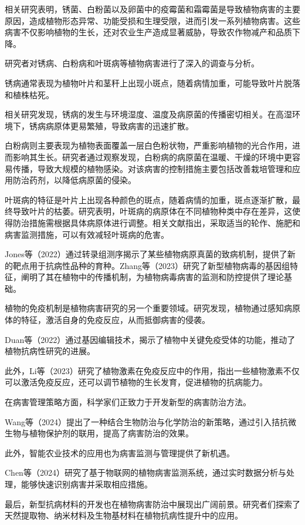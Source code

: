 \documentclass[AutoFakeBold]{LZUThesis-PgD&PhD}
\begin{document}
相关研究表明，锈菌、白粉菌以及卵菌中的疫霉菌和霜霉菌是导致植物病害的主要原因，造成植物形态异常、功能受损和生理受限，进而引发一系列植物病害。这些病害不仅影响植物的生长，还对农业生产造成显著威胁，导致农作物减产和品质下降。

研究者对锈病、白粉病和叶斑病等植物病害进行了深入的调查与分析。

锈病通常表现为植物叶片和茎秆上出现小斑点，随着病情加重，可能导致叶片脱落和植株枯死。

相关研究发现，锈病的发生与环境湿度、温度及病原菌的传播密切相关。在高湿环境下，锈病病原体更易繁殖，导致病害的迅速扩散。

白粉病则主要表现为植物表面覆盖一层白色粉状物，严重影响植物的光合作用，进而影响其生长。研究者通过观察发现，白粉病的病原菌在温暖、干燥的环境中更容易传播，导致大规模的植物感染。对该病害的控制措施主要包括改善栽培管理和应用防治药剂，以降低病原菌的侵染。

叶斑病的特征是叶片上出现各种颜色的斑点，随着病情的加重，斑点逐渐扩散，最终导致叶片的枯萎。研究表明，叶斑病的病原体在不同植物种类中存在差异，这使得防治措施需根据具体病原体进行调整。相关文献指出，采取适当的轮作、施肥和病害监测措施，可以有效减轻叶斑病的危害。

Jones等（2022）通过转录组测序揭示了某些植物病原真菌的致病机制，提供了新的靶点用于抗病性品种的育种\cite{jones2022}。Zhang等（2023）研究了新型植物病毒的基因组特征，阐明了其在植物中的传播机制，为植物病毒病害的监测和防控提供了理论基础\cite{zhang2023genomic}。

植物的免疫机制是植物病害研究的另一个重要领域。研究发现，植物通过感知病原体的特征，激活自身的免疫反应，从而抵御病害的侵袭。

Duan等（2022）通过基因编辑技术，揭示了植物中关键免疫受体的功能，推动了植物抗病性研究的进展\cite{duan2022gene}。

此外，Li等（2023）研究了植物激素在免疫反应中的作用，指出一些植物激素不仅可以激活免疫反应，还可以调节植物的生长发育，促进植物的抗病能力\cite{li2023role}。

在病害管理策略方面，科学家们正致力于开发新型的病害防治方法。

Wang等（2024）提出了一种结合生物防治与化学防治的新策略，通过引入拮抗微生物与植物保护剂的联用，提高了病害防治的效果\cite{wang2024novel}。


此外，智能农业技术的应用也为病害监测与管理提供了新机遇。

Chen等（2024）研究了基于物联网的植物病害监测系统，通过实时数据分析与处理，能够快速识别病害并采取相应措施\cite{chen2024iot}。

最后，新型抗病材料的开发也在植物病害防治中展现出广阔前景。研究者们探索了天然提取物、纳米材料及生物基材料在植物抗病性提升中的应用。
\end{document}
